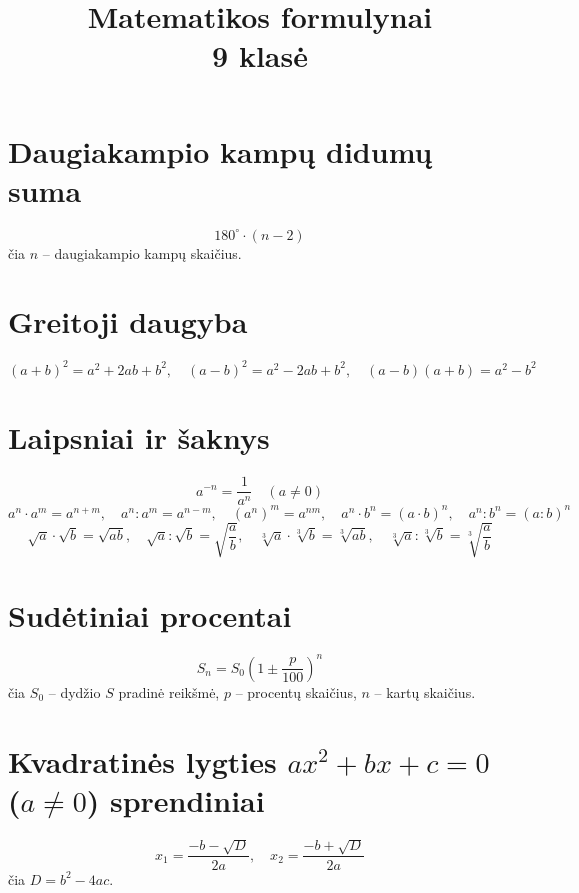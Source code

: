 \documentclass[12pt,a4paper]{article}
\title{Matematikos formulynai \\ 9 klasė}
\date{}
\begin{document}
\maketitle

\section*{Daugiakampio kampų didumų suma}

\[
180^\circ \cdot (n - 2)
\]
čia $n$ -- daugiakampio kampų skaičius.

\section*{Greitoji daugyba}

\[
(a+b)^2 = a^2 + 2ab + b^2, \quad
(a-b)^2 = a^2 - 2ab + b^2, \quad
(a-b)(a+b) = a^2 - b^2
\]

\section*{Laipsniai ir šaknys}

\[
a^{-n} = \frac{1}{a^n} \quad (a \neq 0)
\]
\[
a^n \cdot a^m = a^{n+m}, \quad
a^n : a^m = a^{n-m}, \quad
(a^n)^m = a^{nm}, \quad
a^n \cdot b^n = (a \cdot b)^n, \quad
a^n : b^n = (a : b)^n
\]
\[
\sqrt{a} \cdot \sqrt{b} = \sqrt{ab}, \quad
\sqrt{a} : \sqrt{b} = \sqrt{\frac{a}{b}}, \quad
\sqrt[3]{a} \cdot \sqrt[3]{b} = \sqrt[3]{ab}, \quad
\sqrt[3]{a} : \sqrt[3]{b} = \sqrt[3]{\frac{a}{b}}
\]

\section*{Sudėtiniai procentai}

\[
S_n = S_0 \left(1 \pm \frac{p}{100}\right)^n
\]
čia $S_0$ -- dydžio $S$ pradinė reikšmė, $p$ -- procentų skaičius, $n$ -- kartų skaičius.

\section*{Kvadratinės lygties $ax^2 + bx + c = 0$ ($a \neq 0$) sprendiniai}

\[
x_1 = \frac{-b - \sqrt{D}}{2a}, \quad x_2 = \frac{-b + \sqrt{D}}{2a}
\]
čia $D = b^2 - 4ac$.
\end{document}

